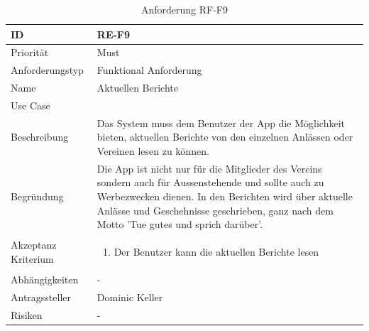 \begin{table}[ht]
\centering
  \begin{tabular}{ l | p{8cm} }
	\hline
	\rowcolor{gray}
	ID 			&	\textbf{RE-F9}\\ \hline
	Priorität 		&	Must\\ \hline
	Anforderungstyp	&	Funktional Anforderung\\ \hline
	Name 			&	Aktuellen Berichte\\ \hline
	Use Case 		&	\nameref{table:use_case_6}\\ \hline
	Beschreibung 	&	Das System muss dem Benutzer der App die Möglichkeit bieten, aktuellen Berichte von den einzelnen Anlässen oder Vereinen lesen zu können.\\ \hline
	Begründung 		&	Die App ist nicht nur für die Mitglieder des Vereins sondern auch für Aussenstehende und sollte auch zu Werbezwecken dienen. In den Berichten wird über aktuelle Anlässe und Geschehnisse geschrieben, ganz nach dem Motto 'Tue gutes und sprich darüber'.\\ \hline
	Akzeptanz Kriterium	&	\begin{enumerate}
					\item Der Benutzer kann die aktuellen Berichte lesen
					\end{enumerate}
					\\ \hline
	Abhängigkeiten 	&	-\\ \hline
	Antragssteller 	&	Dominic Keller\\ \hline
	Risiken	 	&	-
  \end{tabular}
   \caption{Anforderung RF-F9}\label{table:req_9}
\end{table}

